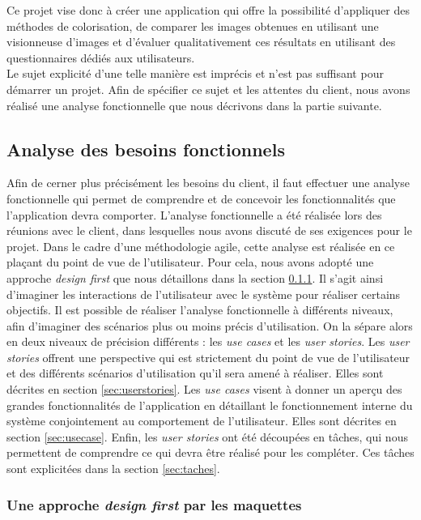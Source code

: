 \documentclass{article}
\begin{document}
Ce projet vise donc à créer une application qui offre la possibilité d’appliquer des méthodes de colorisation, 
de comparer les images obtenues en utilisant une visionneuse d’images et d'évaluer qualitativement ces résultats en utilisant 
des questionnaires dédiés aux utilisateurs. \\

Le sujet explicité d'une telle manière est imprécis et n'est pas suffisant pour démarrer un projet. Afin de spécifier ce sujet
et les attentes du client, nous avons réalisé une analyse fonctionnelle que nous décrivons dans la partie suivante.

\subsection{Analyse des besoins fonctionnels}\label{sec:analyse-fonctionnelle}

Afin de cerner plus précisément les besoins du client, il faut effectuer une analyse fonctionnelle qui permet de comprendre
et de concevoir les fonctionnalités que l'application devra comporter. L'analyse fonctionnelle a été réalisée lors des réunions avec le client,
dans lesquelles nous avons discuté de ses exigences pour le projet. Dans le cadre d'une méthodologie agile, cette analyse est réalisée en ce plaçant du
point de vue de l'utilisateur. Pour cela, nous avons adopté une approche \textit{design first} que nous détaillons dans la section \ref{sec:design-first}. Il s'agit ainsi d'imaginer les interactions de l'utilisateur avec le système pour réaliser certains objectifs. 
Il est possible de réaliser l'analyse fonctionnelle à différents niveaux, afin d'imaginer 
des scénarios plus ou moins précis d'utilisation. On la sépare alors en deux niveaux de précision différents :
les \textit{use cases} et les \textit{user stories}.  Les \textit{user stories} offrent une perspective qui est strictement du point de vue de l'utilisateur et des différents scénarios d'utilisation qu'il sera amené à réaliser. 
Elles sont décrites en section \ref{sec:userstories}. Les \textit{use cases} visent à donner un aperçu 
des grandes fonctionnalités de l'application en détaillant le fonctionnement interne du système conjointement au comportement de l'utilisateur. Elles sont décrites en section \ref{sec:usecase}. 
Enfin, les \textit{user stories} ont été découpées en tâches, qui nous permettent de comprendre ce qui devra être réalisé pour les
compléter. Ces tâches sont explicitées dans la section \ref{sec:taches}.

\subsubsection{Une approche \textit{design first} par les maquettes}\label{sec:design-first}
\end{document}
